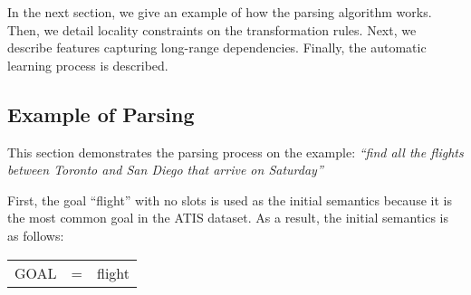 \documentclass{article}
\begin{document}


In the next section, we give an example of how the parsing algorithm works. Then, we detail locality constraints on the transformation rules.
Next, we describe features capturing long-range dependencies.
Finally, the automatic learning process is described. 


\subsection{Example of Parsing} \label{sec:example}

This section demonstrates the parsing process on the example: \textit{``find all the flights between Toronto and San Diego that arrive on Saturday''} 

First, the goal ``flight'' with no slots is used as the initial semantics because it is the most common goal in the ATIS dataset. As a result, the initial semantics is as follows:

\vspace{.15cm}
\begin{tabular}{lll}
  GOAL & = & flight
\end{tabular} 
\vspace{.15cm}
\end{document}
